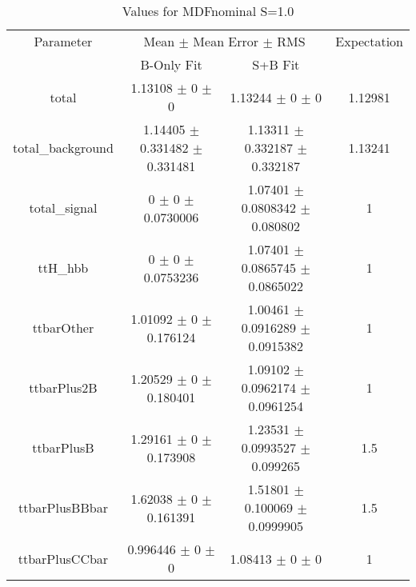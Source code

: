 \begin{table}
\centering
\caption{Values for MDFnominal S=1.0}
\begin{tabular}{cccc}
\toprule
Parameter & \multicolumn{2}{c}{Mean $\pm$ Mean Error $\pm$ RMS} & Expectation\\
 & B-Only Fit & S+B Fit & \\
\midrule
total & \num{1.13108} $\pm$ \num{0} $\pm$ \num{0} & \num{1.13244} $\pm$ \num{0} $\pm$ \num{0} & \num{1.12981}\\
total\_background & \num{1.14405} $\pm$ \num{0.331482} $\pm$ \num{0.331481} & \num{1.13311} $\pm$ \num{0.332187} $\pm$ \num{0.332187} & \num{1.13241}\\
total\_signal & \num{0} $\pm$ \num{0} $\pm$ \num{0.0730006} & \num{1.07401} $\pm$ \num{0.0808342} $\pm$ \num{0.080802} & \num{1}\\
ttH\_hbb & \num{0} $\pm$ \num{0} $\pm$ \num{0.0753236} & \num{1.07401} $\pm$ \num{0.0865745} $\pm$ \num{0.0865022} & \num{1}\\
ttbarOther & \num{1.01092} $\pm$ \num{0} $\pm$ \num{0.176124} & \num{1.00461} $\pm$ \num{0.0916289} $\pm$ \num{0.0915382} & \num{1}\\
ttbarPlus2B & \num{1.20529} $\pm$ \num{0} $\pm$ \num{0.180401} & \num{1.09102} $\pm$ \num{0.0962174} $\pm$ \num{0.0961254} & \num{1}\\
ttbarPlusB & \num{1.29161} $\pm$ \num{0} $\pm$ \num{0.173908} & \num{1.23531} $\pm$ \num{0.0993527} $\pm$ \num{0.099265} & \num{1.5}\\
ttbarPlusBBbar & \num{1.62038} $\pm$ \num{0} $\pm$ \num{0.161391} & \num{1.51801} $\pm$ \num{0.100069} $\pm$ \num{0.0999905} & \num{1.5}\\
ttbarPlusCCbar & \num{0.996446} $\pm$ \num{0} $\pm$ \num{0} & \num{1.08413} $\pm$ \num{0} $\pm$ \num{0} & \num{1}\\
\bottomrule
\end{tabular}
\end{table}